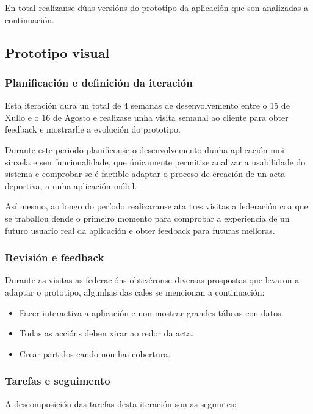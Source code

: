   En total realízanse dúas versións do prototipo da aplicación que son 
analizadas a continuación.

    \subsection{Prototipo visual}

      \subsubsection{Planificación e definición da iteración}
      Esta iteración dura un total de 4 semanas de desenvolvemento entre o 15 
de Xullo e o 16 de Agosto e realizase unha visita semanal ao cliente para obter 
feedback e mostrarlle a evolución do prototipo.

      Durante este periodo planificouse o desenvolvemento dunha aplicación moi 
sinxela e sen funcionalidade, que únicamente permitise analizar a usabilidade do 
sistema e comprobar se é factible adaptar o proceso de creación de un acta 
deportiva, a unha aplicación móbil.

    Así mesmo, ao longo do período realizaranse ata tres visitas a federación 
coa que se traballou dende o primeiro momento para comprobar a experiencia de 
un futuro usuario real da aplicación e obter feedback para futuras melloras.

      \subsubsection{Revisión e feedback}
      Durante as visitas as federacións obtivéronse diversas prospostas que 
levaron a adaptar o prototipo, algunhas das cales se mencionan a continuación:

      \begin{itemize}
        \item Facer interactiva a aplicación e non mostrar grandes táboas con 
datos.
        \item Todas as accións deben xirar ao redor da acta.
        \item Crear partidos cando non hai cobertura.
      \end{itemize}

      \subsubsection{Tarefas e seguimento}

      A descomposición das tarefas desta iteración son as seguintes:

